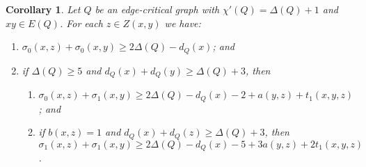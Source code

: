 \documentclass[12pt,reqno]{amsart}
\theoremstyle{plain}
\newtheorem{cor}[thm]{Corollary}
\theoremstyle{definition}
\theoremstyle{remark}
\begin{document}
\begin{cor}\label{WoodallImprovement}
Let $Q$ be an edge-critical graph with $\chi'(Q) = \Delta(Q) + 1$ and $xy \in E(Q)$.  For each $z \in Z(x, y)$ we have:
\begin{enumerate}
\item $\sigma_0(x, z) + \sigma_0(x, y) \ge 2\Delta(Q) - d_Q(x)$; and
\item if $\Delta(Q) \ge 5$ and $d_Q(x) + d_Q(y) \ge \Delta(Q) + 3$, then
	\begin{enumerate}
	\item $\sigma_0(x, z) + \sigma_1(x, y) \ge 2\Delta(Q) - d_Q(x) - 2 + a(y, z) + t_1(x, y, z)$; and
    \item if $b(x, z) = 1$ and $d_Q(x) + d_Q(z) \ge \Delta(Q) + 3$, then $\sigma_1(x, z) + \sigma_1(x, y) \ge 2\Delta(Q) - d_Q(x) - 5 + 3a(y, z) + 2t_1(x, y, z)$.
	\end{enumerate}
\end{enumerate}
\end{cor}
\end{document}
